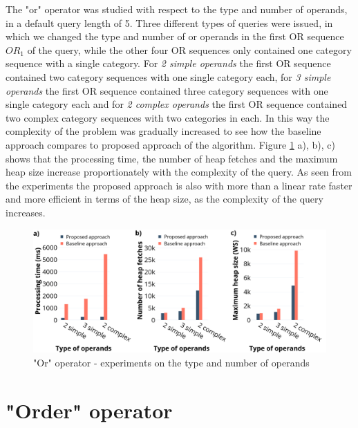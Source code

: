 The "or" operator was studied with respect to the type and number of operands, in a default query length of 5. Three different types of queries were issued, in which we changed the type and number of or operands in the first OR sequence $OR_1$ of the query, while the other four OR sequences only contained one category sequence with a single category. For \textit{2 simple operands} the first OR sequence contained two category sequences with one single category each, for \textit{3 simple operands} the first OR sequence contained three category sequences with one single category each and for \textit{2 complex operands} the first OR sequence contained two complex category sequences with two categories in each. In this way the complexity of the problem was gradually increased to see how the baseline approach compares to proposed approach of the algorithm.  
Figure \ref{fig:or} a), b), c) shows that the processing time, the number of heap fetches and the maximum heap size increase proportionately with the complexity of the query. As seen from the experiments the proposed approach is also with more than a linear rate faster and more efficient in terms of the heap size, as the complexity of the query increases. 

\begin{figure}[H]
	\includegraphics[scale=0.29]{images/or_30.png}
	\centering
	\caption{"Or" operator - experiments on the type and number of operands}
	\label{fig:or}
\end{figure}


\section{"Order" operator}
\label{sec:experimentsOrder}


